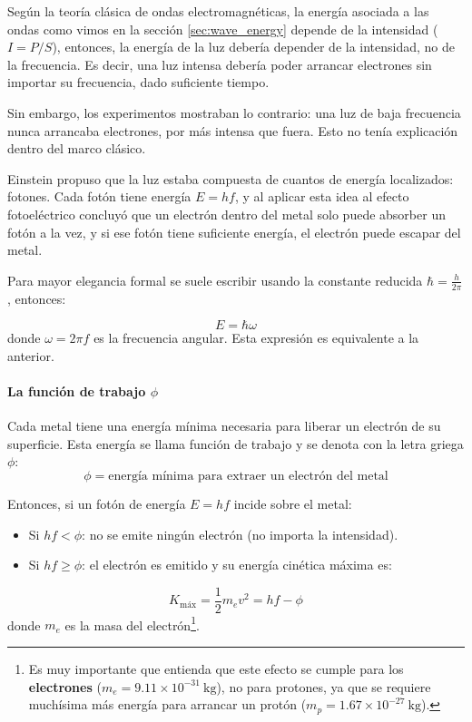 Según la teoría clásica de ondas electromagnéticas, la energía asociada a las ondas como vimos en la sección \ref{sec:wave_energy} depende de la intensidad (\(I=P/S\)), entonces, la energía de la luz debería depender de la intensidad, no de la frecuencia. Es decir, una luz intensa debería poder arrancar electrones sin importar su frecuencia, dado suficiente tiempo.

Sin embargo, los experimentos mostraban lo contrario: una luz de baja frecuencia nunca arrancaba electrones, por más intensa que fuera. Esto no tenía explicación dentro del marco clásico.

Einstein propuso que la luz estaba compuesta de cuantos de energía localizados: fotones. Cada fotón tiene energía \(E = h f\), y al aplicar esta idea al efecto fotoeléctrico concluyó que un electrón dentro del metal solo puede absorber un fotón a la vez, y si ese fotón tiene suficiente energía, el electrón puede escapar del metal.

Para mayor elegancia formal se suele escribir usando la constante reducida \(\hbar = \frac{h}{2\pi}\), entonces:

\begin{equation*}
  E = \hbar \omega
\end{equation*}
donde \(\omega = 2\pi f\) es la frecuencia angular. Esta expresión es equivalente a la anterior.

\paragraph{La función de trabajo \(\phi\)}

Cada metal tiene una energía mínima necesaria para liberar un electrón de su superficie. Esta energía se llama función de trabajo y se denota con la letra griega \(\phi\):
\begin{equation*}
  \boxed{
    \phi = \text{energía mínima para extraer un electrón del metal}
  }
\end{equation*}

Entonces, si un fotón de energía \(E = h f\) incide sobre el metal:

\begin{itemize}
  \item Si \(h f < \phi\): no se emite ningún electrón (no importa la intensidad).
  \item Si \(h f \geq \phi\): el electrón es emitido y su energía cinética máxima es:
\end{itemize}

\begin{equation*}
  K_{\text{máx}} = \frac{1}{2} m_{e} v^2 = h f - \phi
\end{equation*}
donde \(m_e\) es la masa del electrón\footnote{Es muy importante que entienda que este efecto se cumple para los \textbf{electrones} (\(m_e = 9.11 \times 10^{-31} \ \text{kg}\)), no para protones, ya que se requiere muchísima más energía para arrancar un protón (\(m_p = 1.67 \times 10^{-27} \ \text{kg}\)).}. 

